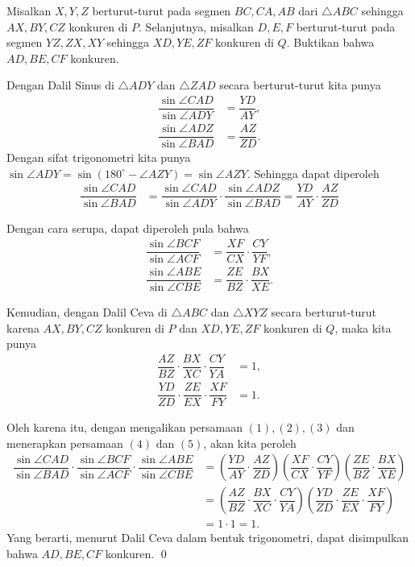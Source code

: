 \documentclass[12pt]{scrartcl}
\begin{document}
	\begin{soalbaru}
		Misalkan $X,Y,Z$ berturut-turut pada segmen $BC,CA,AB$ dari $\triangle ABC$ sehingga $AX, BY, CZ$ konkuren di $P$. Selanjutnya, misalkan $D,E,F$ berturut-turut pada segmen $YZ,ZX,XY$ sehingga $XD,YE,ZF$ konkuren di $Q$. Buktikan bahwa $AD,BE,CF$ konkuren.\\[-10pt]
		
		\begin{solusi}
			Dengan Dalil Sinus di $\triangle ADY$ dan $\triangle ZAD$ secara berturut-turut kita punya
			\begin{align*}
			\dfrac{\sin \angle CAD}{\sin \angle ADY}&=\dfrac{YD}{AY},\\[3.5pt]
			\dfrac{\sin \angle ADZ}{\sin \angle BAD}&=\dfrac{AZ}{ZD}.
			\end{align*}
			Dengan sifat trigonometri kita punya $\sin \angle ADY = \sin (180^\circ-\angle AZY) = \sin \angle AZY$. Sehingga dapat diperoleh 
			\begin{align}
			\dfrac{\sin \angle CAD}{\sin \angle BAD}&=\dfrac{\sin \angle CAD}{\sin \angle ADY}\cdot \dfrac{\sin \angle ADZ}{\sin \angle BAD}=\dfrac{YD}{AY}\cdot\dfrac{AZ}{ZD}
			\end{align}
			
			Dengan cara serupa, dapat diperoleh pula bahwa 
			\begin{align}
			\dfrac{\sin \angle BCF}{\sin \angle ACF}&=\dfrac{XF}{CX}\cdot\dfrac{CY}{YF},\\[3.5pt]
			\dfrac{\sin \angle ABE}{\sin \angle CBE}&=\dfrac{ZE}{BZ}\cdot\dfrac{BX}{XE}.
			\end{align}
			
			Kemudian, dengan Dalil Ceva di $\triangle ABC$ dan $\triangle XYZ$ secara berturut-turut karena $AX, BY, CZ$ konkuren di $P$ dan $XD,YE,ZF$ konkuren di $Q$, maka kita punya
			\begin{align}
			\dfrac{AZ}{BZ}\cdot\dfrac{BX}{XC}\cdot\dfrac{CY}{YA}&=1,\\[3.5pt]
			\dfrac{YD}{ZD}\cdot\dfrac{ZE}{EX}\cdot\dfrac{XF}{FY}&=1.
			\end{align}
			
			Oleh karena itu, dengan mengalikan persamaan $(1),(2),(3)$ dan menerapkan persamaan $(4)$ dan $(5)$, akan kita peroleh 
			\begin{align*}
			\dfrac{\sin \angle CAD}{\sin \angle BAD}\cdot\dfrac{\sin \angle BCF}{\sin \angle ACF}\cdot\dfrac{\sin \angle ABE}{\sin \angle CBE}&=\left(\dfrac{YD}{AY}\cdot\dfrac{AZ}{ZD}\right)\left(\dfrac{XF}{CX}\cdot\dfrac{CY}{YF}\right)\left(\dfrac{ZE}{BZ}\cdot\dfrac{BX}{XE}\right)\\[3.5pt]
			&=\left(\dfrac{AZ}{BZ}\cdot\dfrac{BX}{XC}\cdot\dfrac{CY}{YA}\right)\left(\dfrac{YD}{ZD}\cdot\dfrac{ZE}{EX}\cdot\dfrac{XF}{FY}\right)\\[3.5pt] &= 1 \cdot 1 = 1.
			\end{align*}
			Yang berarti, menurut Dalil Ceva dalam bentuk trigonometri, dapat disimpulkan bahwa $AD,BE,CF$ konkuren. \qed
		\end{solusi}
	\end{soalbaru}
	
\end{document}
